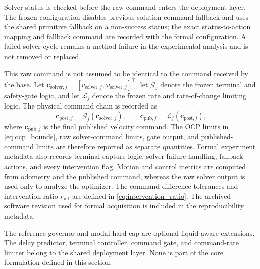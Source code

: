 Solver status is checked before the raw command enters the deployment layer.
The frozen configuration disables previous-solution command fallback and uses
the shared primitive fallback on a non-success status; the exact status-to-action
mapping and fallback command are recorded with the formal configuration. A
failed solver cycle remains a method failure in the experimental analysis and
is not removed or replaced.

This raw command is not assumed to be identical to the command received by the
base. Let
\(\bm c_{\mathrm{solver},j}
=[v_{\mathrm{solver},j},\omega_{\mathrm{solver},j}]^\top\), let
\(\mathcal G_j\) denote the frozen terminal and safety-gate logic, and let
\(\mathcal L_j\) denote the frozen rate and rate-of-change limiting logic. The
physical command chain is recorded as
\begin{equation}
  \bm c_{\mathrm{post},j}=\mathcal G_j(\bm c_{\mathrm{solver},j}),
  \qquad
  \bm c_{\mathrm{pub},j}=\mathcal L_j(\bm c_{\mathrm{post},j}),
  \label{eq:command_chain}
\end{equation}
where \(\bm c_{\mathrm{pub},j}\) is the final published velocity command. The
OCP limits in \cref{eq:ocp_bounds}, raw solver-command limits, gate output, and
published-command limits are therefore reported as separate quantities. Formal
experiment metadata also records terminal capture logic, solver-failure
handling, fallback actions, and every intervention flag. Motion and control
metrics are computed from odometry and the published command, whereas the raw
solver output is used only to analyze the optimizer. The command-difference
tolerances and intervention ratio \(r_{\mathrm{int}}\) are defined in
\cref{eq:intervention_ratio}. The archived software revision used for formal
acquisition is included in the reproducibility metadata.

The reference governor and modal hard cap are optional liquid-aware extensions.
The delay predictor, terminal controller, command gate, and command-rate limiter
belong to the shared deployment layer. None is part of the core \SMPCC{}
formulation defined in this section.
